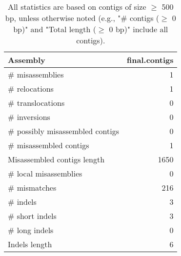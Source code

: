 \documentclass[12pt,a4paper]{article}
\begin{document}
\begin{table}[ht]
\begin{center}
\caption{All statistics are based on contigs of size $\geq$ 500 bp, unless otherwise noted (e.g., "\# contigs ($\geq$ 0 bp)" and "Total length ($\geq$ 0 bp)" include all contigs).}
\begin{tabular}{|l*{1}{|r}|}
\hline
Assembly & final.contigs \\ \hline
\# misassemblies & 1 \\ \hline
\hspace{5mm}\# relocations & 1 \\ \hline
\hspace{5mm}\# translocations & 0 \\ \hline
\hspace{5mm}\# inversions & 0 \\ \hline
\# possibly misassembled contigs & 0 \\ \hline
\# misassembled contigs & 1 \\ \hline
Misassembled contigs length & 1650 \\ \hline
\# local misassemblies & 0 \\ \hline
\# mismatches & 216 \\ \hline
\# indels & 3 \\ \hline
\hspace{5mm}\# short indels & 3 \\ \hline
\hspace{5mm}\# long indels & 0 \\ \hline
Indels length & 6 \\ \hline
\end{tabular}
\end{center}
\end{table}
\end{document}
